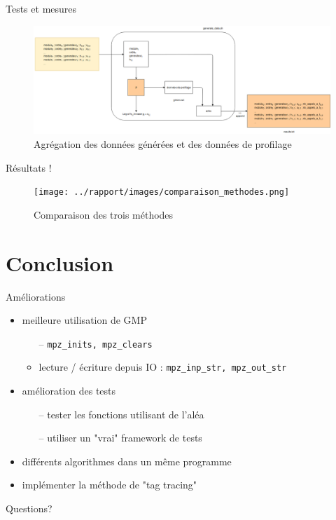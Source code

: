 \documentclass{beamer}
\begin{document}
  \begin{frame}{Tests et mesures}
    \begin{figure}
      \center{}
      \includegraphics[scale=0.2]{images/generate_measurement_data_for_presentation.png}
      \caption{Agrégation des données générées et des données de profilage}
    \end{figure}
  \end{frame}

  \begin{frame}{Résultats !}
    \begin{figure}
      \center{}
      \texttt{[image: ../rapport/images/comparaison\_methodes.png]}
      \caption{Comparaison des trois méthodes}
    \end{figure}
  \end{frame}


  \section{Conclusion}

  \begin{frame}{Améliorations}
    \begin{itemize}
      \item meilleure utilisation de GMP
        \begin{itemize}
          \item[--] \lstinline{mpz_inits, mpz_clears}
          \item[--] lecture / écriture depuis IO : \lstinline{mpz_inp_str, mpz_out_str}
        \end{itemize}
      \item amélioration des tests
        \begin{itemize}
          \item[--] tester les fonctions utilisant de l'aléa
          \item[--] utiliser un "vrai" framework de tests
        \end{itemize}
      \item différents algorithmes dans un même programme
      \item implémenter la méthode de "tag tracing"
    \end{itemize}
  \end{frame}

  {
  \begin{frame}[standout]
    Questions?
  \end{frame}
  }
\end{document}
